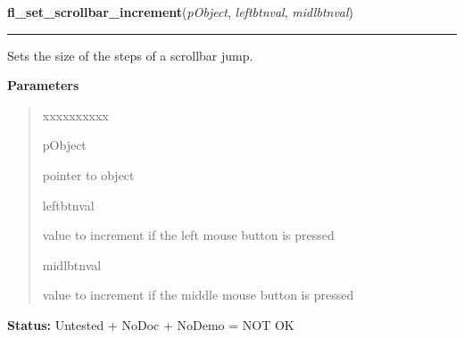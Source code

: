     \label{xformslib:library:fl_set_scrollbar_increment}

    \vspace{0.5ex}

\hspace{.8\funcindent}\begin{boxedminipage}{\funcwidth}

    \raggedright \textbf{fl\_set\_scrollbar\_increment}(\textit{pObject}, \textit{leftbtnval}, \textit{midlbtnval})

    \vspace{-1.5ex}

    \rule{\textwidth}{0.5\fboxrule}
\setlength{\parskip}{2ex}
    Sets the size of the steps of a scrollbar jump.

\setlength{\parskip}{1ex}
      \textbf{Parameters}
      \vspace{-1ex}

      \begin{quote}
        \begin{Ventry}{xxxxxxxxxx}

          \item[pObject]

          pointer to object

          \item[leftbtnval]

          value to increment if the left mouse button is pressed

          \item[midlbtnval]

          value to increment if the middle mouse button is pressed

        \end{Ventry}

      \end{quote}

\textbf{Status:} Untested + NoDoc + NoDemo = NOT OK



    \end{boxedminipage}

    \label{xformslib:library:fl_get_scrollbar_increment}

    \vspace{0.5ex}

